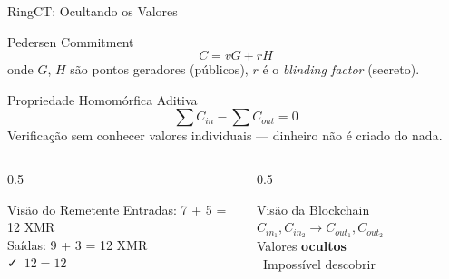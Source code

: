 \documentclass{libs/ufc_format}
\begin{document}
\begin{frame}{RingCT: Ocultando os Valores}
    \begin{block}{Pedersen Commitment}
        \[
        C = vG + rH
        \]
        onde $G$, $H$ são pontos geradores (públicos), $r$ é o \textit{blinding factor} (secreto).
    \end{block}

    \vspace{0.15cm}

    \begin{block}{Propriedade Homomórfica Aditiva}
        \[
        \sum C_{in} - \sum C_{out} = 0
        \]
        Verificação sem conhecer valores individuais --- dinheiro não é criado do nada.
    \end{block}

    \vspace{0.15cm}

    \begin{columns}
        \begin{column}{0.5\textwidth}
            \begin{exampleblock}{\footnotesize Visão do Remetente}
                {\small Entradas: 7 + 5 = 12 XMR \\
                Saídas: 9 + 3 = 12 XMR \\
                \faCheck\ $12 = 12$}
            \end{exampleblock}
        \end{column}
        \begin{column}{0.5\textwidth}
            \begin{alertblock}{\footnotesize Visão da Blockchain}
                {\small $C_{in_1}, C_{in_2} \to C_{out_1}, C_{out_2}$ \\
                Valores \textbf{ocultos} \\
                \faEyeSlash\ Impossível descobrir}
            \end{alertblock}
        \end{column}
    \end{columns}
\end{frame}
\end{document}
